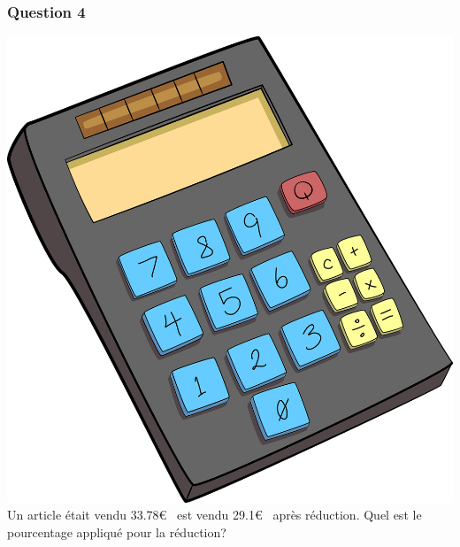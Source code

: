 \documentclass[15pt, mathserif]{beamer}
\begin{document}
\begin{frame} 
	\frametitle{Question 4}
\includegraphics[scale=0.01]{calculatrice}Un article était vendu 33.78\euro ~ est vendu 29.1\euro ~ après réduction. Quel est le pourcentage appliqué pour la réduction? \end{frame}
\end{document}
